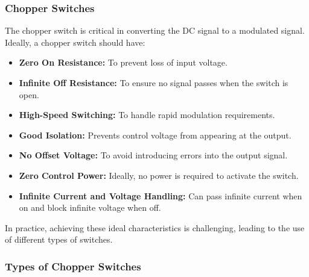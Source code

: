 \documentclass[a4paper,9pt,twoside,openany,twocolumn]{memoir}
\begin{document}
\subsubsection{Chopper Switches}
The chopper switch is critical in converting the DC signal to a modulated signal. Ideally, a chopper switch should have:
\begin{itemize}
    \item \textbf{Zero On Resistance:} To prevent loss of input voltage.
    \item \textbf{Infinite Off Resistance:} To ensure no signal passes when the switch is open.
    \item \textbf{High-Speed Switching:} To handle rapid modulation requirements.
    \item \textbf{Good Isolation:} Prevents control voltage from appearing at the output.
    \item \textbf{No Offset Voltage:} To avoid introducing errors into the output signal.
    \item \textbf{Zero Control Power:} Ideally, no power is required to activate the switch.
    \item \textbf{Infinite Current and Voltage Handling:} Can pass infinite current when on and block infinite voltage when off.
\end{itemize}
In practice, achieving these ideal characteristics is challenging, leading to the use of different types of switches.

\subsubsection{Types of Chopper Switches}
\end{document}
